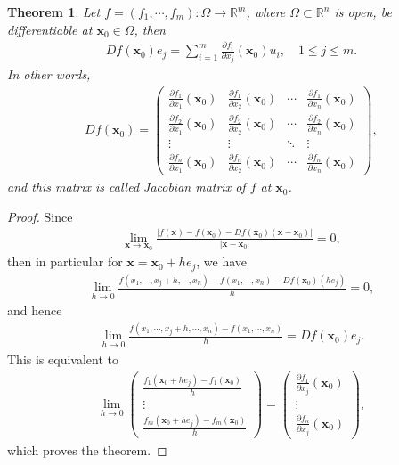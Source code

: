 \documentclass[10pt]{book}
\newtheorem{theorem}{Theorem}[chapter]
\theoremstyle{definition}
\numberwithin{equation}{chapter}
\begin{document}
\begin{theorem}\label{th_75}
Let $f = (f_1, \cdots, f_m): \Omega \to \mathbb{R}^m$, where $\Omega \subset \mathbb{R}^n$ is open, be differentiable at $\mathbf{x}_0 \in \Omega$, then
\begin{align*}
    Df(\mathbf{x}_0)e_j = \sum^m_{i=1} \frac{\partial f_i}{\partial x_j}(\mathbf{x}_0) u_i, \quad 1 \leq j \leq m.
\end{align*}
In other words,
\begin{align*}
    Df(\mathbf{x}_0) = \begin{pmatrix}
        \frac{\partial f_1}{\partial x_1}(\mathbf{x}_0) & \frac{\partial f_1}{\partial x_2}(\mathbf{x}_0) & \cdots & \frac{\partial f_1}{\partial x_n}(\mathbf{x}_0) \\
        \frac{\partial f_2}{\partial x_1}(\mathbf{x}_0) & \frac{\partial f_2}{\partial x_2}(\mathbf{x}_0) & \cdots & \frac{\partial f_2}{\partial x_n}(\mathbf{x}_0) \\
        \vdots & \vdots & \ddots & \vdots \\
        \frac{\partial f_n}{\partial x_1}(\mathbf{x}_0) & \frac{\partial f_n}{\partial x_2}(\mathbf{x}_0) & \cdots & \frac{\partial f_n}{\partial x_n}(\mathbf{x}_0)
    \end{pmatrix},
\end{align*}
and this matrix is called Jacobian matrix of $f$ at $\mathbf{x}_0$.
\end{theorem}
\begin{proof}
Since
\begin{align*}
    \lim_{\mathbf{x} \to \mathbf{x}_0} \frac{\left|f(\mathbf{x}) - f(\mathbf{x}_0) - Df(\mathbf{x}_0) (\mathbf{x} - \mathbf{x}_0)\right|}{\left|\mathbf{x} - \mathbf{x}_0\right|} = 0,
\end{align*}
then in particular for $\mathbf{x} = \mathbf{x}_0 + he_j$, we have
\begin{align*}
    \lim_{h \to 0} \frac{f(x_1,\cdots,x_j+h, \cdots,x_n) - f(x_1,\cdots,x_n) - Df(\mathbf{x}_0)(he_j)}{h} = 0,
\end{align*}
and hence
\begin{align*}
    \lim_{h \to 0} \frac{f(x_1,\cdots,x_j+h, \cdots,x_n) - f(x_1,\cdots,x_n)}{h} = Df(\mathbf{x}_0)e_j.
\end{align*}
This is equivalent to
\begin{align*}
    \lim_{h \to 0} \begin{pmatrix}
        \frac{f_1(\mathbf{x}_0 + he_j) - f_1(\mathbf{x}_0)}{h} \\
        \vdots \\
        \frac{f_m(\mathbf{x}_0 + he_j) - f_m(\mathbf{x}_0)}{h}
    \end{pmatrix} = \begin{pmatrix}
        \frac{\partial f_1}{\partial x_j}(\mathbf{x}_0) \\
        \vdots \\
        \frac{\partial f_n}{\partial x_j}(\mathbf{x}_0)
    \end{pmatrix},
\end{align*}
which proves the theorem.
\end{proof}
\end{document}
